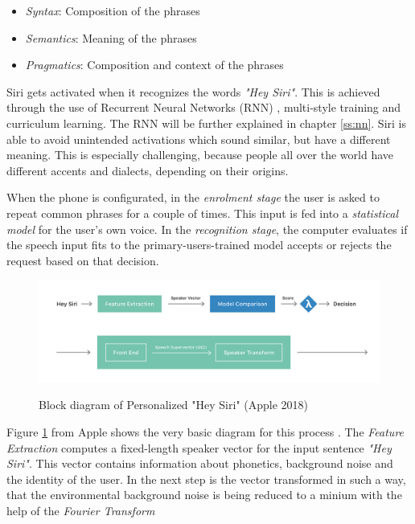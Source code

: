 \begin{itemize}
\item \textit{Syntax}: Composition of the phrases
\item \textit{Semantics}: Meaning of the phrases
\item \textit{Pragmatics}: Composition and context of the phrases
\end{itemize}

Siri gets activated when it recognizes the words \textit{"Hey Siri"}. This is achieved through the use of Recurrent Neural Networks (RNN) \cite{siri2}, multi-style training and curriculum learning. The RNN will be further explained in chapter \ref{ss:nn}. Siri is able to avoid unintended activations which sound similar, but have a different meaning. This is especially challenging, because people all over the world have different accents and dialects, depending on their origins. 

When the phone is configurated, in the \textit{enrolment stage} the user is asked to repeat common phrases for a couple of times. This input is fed into a \textit{statistical model} for the user’s own voice. In the \textit{recognition stage}, the computer evaluates if the speech input fits to the primary-users-trained model accepts or rejects the request based on that decision.

	
\begin{figure}
  \begin{center}
  \includegraphics[width=4.5in]{photos/siri1}\\
  \caption{Block diagram of Personalized "Hey Siri" (Apple 2018)\cite{siri2}}\label{siri1}
  \end{center}
\end{figure}

Figure \ref{siri1} from Apple shows the very basic diagram for this process \cite{siri2}. The \textit{Feature Extraction} computes a fixed-length speaker vector for the input sentence \textit{"Hey Siri"}. This vector contains information about phonetics, background noise and the identity of the user. In the next step is the vector transformed in such a way, that the environmental background noise is being reduced to a minium with the help of the \textit{Fourier Transform}



